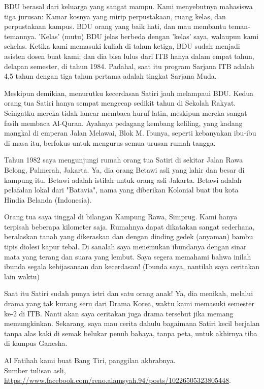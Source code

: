 BDU berasal dari keluarga yang sangat mampu. Kami menyebutnya mahasiswa tiga jurusan: Kamar kosnya yang mirip perpustakaan, ruang kelas, dan perpustakaan kampus. BDU orang yang baik hati, dan mau membantu teman-temannya. 'Kelas' (mutu) BDU jelas berbeda dengan 'kelas' saya, walaupun kami sekelas. Ketika kami memasuki kuliah di tahun ketiga, BDU sudah menjadi asisten dosen buat kami; dan dia bisa lulus dari ITB hanya dalam empat tahun, delapan semester, di tahun 1984. Padahal, saat itu program Sarjana ITB adalah 4,5 tahun dengan tiga tahun pertama adalah tingkat Sarjana Muda.

Meskipun demikian, menurutku kecerdasan Satiri jauh melampaui BDU. Kedua orang tua Satiri hanya sempat mengecap sedikit tahun di Sekolah Rakyat. Seingatku mereka tidak lancar membaca huruf latin, meskipun mereka sangat fasih membaca Al-Quran. Ayahnya pedagang kembang keliling, yang kadang mangkal di emperan Jalan Melawai, Blok M. Ibunya, seperti kebanyakan ibu-ibu di masa itu, berfokus untuk mengurus semua urusan rumah tangga.

Tahun 1982 saya mengunjungi rumah orang tua Satiri di sekitar Jalan Rawa Belong, Palmerah, Jakarta. Ya, dia orang Betawi asli yang lahir dan besar di kampung itu. Betawi adalah istilah untuk orang asli Jakarta. Betawi adalah pelafalan lokal dari "Batavia", nama yang diberikan Kolonial buat ibu kota Hindia Belanda (Indonesia).

Orang tua saya tinggal di bilangan Kampung Rawa, Simprug. Kami hanya terpisah beberapa kilometer saja. Rumahnya dapat dikatakan sangat sederhana, beralaskan tanah yang dikeraskan dan dengan dinding gedek (anyaman) bambu tipis diolesi kapur tebal. Di sanalah saya menemukan ibundanya dengan sinar mata yang terang dan suara yang lembut. Saya segera memahami bahwa inilah ibunda segala kebijasanaan dan kecerdasan! (Ibunda saya, nantilah saya ceritakan lain waktu)

Saat itu Satiri sudah punya istri dan satu orang anak! Ya, dia menikah, melalui drama yang tak kurang seru dari Drama Korea, waktu kami memasuki semester ke-2 di ITB. Nanti akan saya ceritakan juga drama tersebut jika memang memungkinkan. Sekarang, saya mau cerita dahulu bagaimana Satiri kecil berjalan tanpa alas kaki di semak belukar penuh bahaya, tanpa peta, untuk akhirnya tiba di kampus Ganesha.

Al Fatihah kami buat Bang Tiri, panggilan akbrabnya.
\\[10pt]
Sumber tulisan asli, \url{https://www.facebook.com/reno.alamsyah.94/posts/10226505323805448}.

